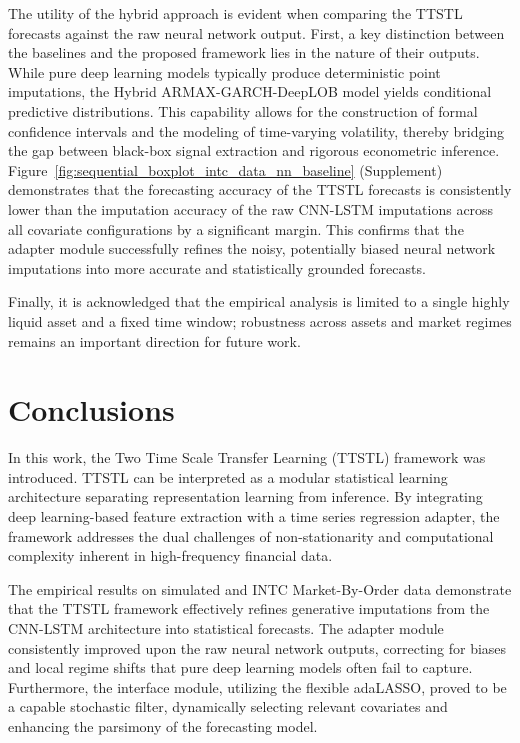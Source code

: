 \documentclass[10pt,a4paper,oneside]{article}
\begin{document}
The utility of the hybrid approach is evident when comparing the TTSTL forecasts against the raw neural network output. First, a key distinction between the baselines and the proposed framework lies in the nature of their outputs. While pure deep learning models typically produce deterministic point imputations, the Hybrid ARMAX-GARCH-DeepLOB model yields conditional predictive distributions. This capability allows for the construction of formal confidence intervals and the modeling of time-varying volatility, thereby bridging the gap between black-box signal extraction and rigorous econometric inference. Figure~\ref{fig:sequential_boxplot_intc_data_nn_baseline} (Supplement) demonstrates that the forecasting accuracy of the TTSTL forecasts is consistently lower than the imputation accuracy of the raw CNN-LSTM imputations across all covariate configurations by a significant margin. This confirms that the adapter module successfully refines the noisy, potentially biased neural network imputations into more accurate and statistically grounded forecasts.

Finally, it is acknowledged that the empirical analysis is limited to a single highly liquid asset and a fixed time window; robustness across assets and market regimes remains an important direction for future work.

\section{Conclusions}
\label{Sect:Conclusions}

In this work, the Two Time Scale Transfer Learning (TTSTL) framework was introduced. TTSTL can be interpreted as a modular statistical learning architecture separating representation learning from inference. By integrating deep learning-based feature extraction with a time series regression adapter, the framework addresses the dual challenges of non-stationarity and computational complexity inherent in high-frequency financial data.

The empirical results on simulated and INTC Market-By-Order data demonstrate that the TTSTL framework effectively refines generative imputations from the CNN-LSTM architecture into statistical forecasts. The adapter module consistently improved upon the raw neural network outputs, correcting for biases and local regime shifts that pure deep learning models often fail to capture. Furthermore, the interface module, utilizing the flexible adaLASSO, proved to be a capable stochastic filter, dynamically selecting relevant covariates and enhancing the parsimony of the forecasting model.
\end{document}
